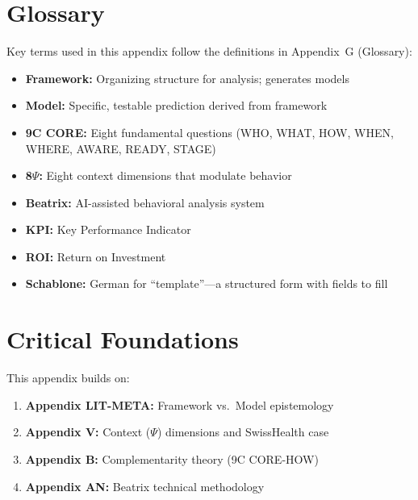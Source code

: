 

\section{Glossary}
\label{sec:consulting-glossary}

Key terms used in this appendix follow the definitions in Appendix~G (Glossary):
\begin{itemize}[nosep]
    \item \textbf{Framework:} Organizing structure for analysis; generates models
    \item \textbf{Model:} Specific, testable prediction derived from framework
    \item \textbf{9C CORE:} Eight fundamental questions (WHO, WHAT, HOW, WHEN, WHERE, AWARE, READY, STAGE)
    \item \textbf{8$\Psi$:} Eight context dimensions that modulate behavior
    \item \textbf{Beatrix:} AI-assisted behavioral analysis system
    \item \textbf{KPI:} Key Performance Indicator
    \item \textbf{ROI:} Return on Investment
    \item \textbf{Schablone:} German for ``template''---a structured form with fields to fill
\end{itemize}


\section{Critical Foundations}
\label{sec:consulting-foundations}

This appendix builds on:
\begin{enumerate}[nosep]
    \item \textbf{Appendix LIT-META:} Framework vs.\ Model epistemology
    \item \textbf{Appendix V:} Context ($\Psi$) dimensions and SwissHealth case
    \item \textbf{Appendix B:} Complementarity theory (9C CORE-HOW)
    \item \textbf{Appendix AN:} Beatrix technical methodology
\end{enumerate}

